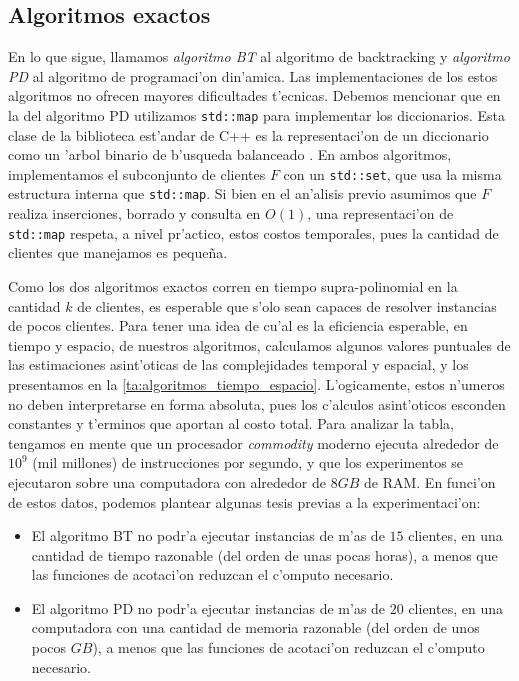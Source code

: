 \subsection{Algoritmos exactos}

\label{su:experimentacion_algoritmos_exactos}

En lo que sigue, llamamos \textit{algoritmo BT} al algoritmo de backtracking y \textit{algoritmo PD} al algoritmo de programaci'on din'amica. Las implementaciones de los estos algoritmos no ofrecen mayores dificultades t'ecnicas. Debemos mencionar que en la del algoritmo PD utilizamos \texttt{std::map} para implementar los diccionarios. Esta clase de la biblioteca est'andar de C++ es la representaci'on de un diccionario como un 'arbol binario de b'usqueda balanceado \cite{Pl00}. En ambos algoritmos, implementamos el subconjunto de clientes $F$ con un \texttt{std::set}, que usa la misma estructura interna que \texttt{std::map}. Si bien en el an'alisis previo asumimos que $F$ realiza inserciones, borrado y consulta en $O(1)$, una representaci'on de \texttt{std::map} respeta, a nivel pr'actico, estos costos temporales, pues la cantidad de clientes que manejamos es peque\~na.

Como los dos algoritmos exactos corren en tiempo supra-polinomial en la cantidad $k$ de clientes, es esperable que s'olo sean capaces de resolver instancias de pocos clientes. Para tener una idea de cu'al es la eficiencia esperable, en tiempo y espacio, de nuestros algoritmos, calculamos algunos valores puntuales de las estimaciones asint'oticas de las complejidades temporal y espacial, y los presentamos en la \autoref{ta:algoritmos_tiempo_espacio}. L'ogicamente, estos n'umeros no deben interpretarse en forma absoluta, pues los c'alculos asint'oticos esconden constantes y t'erminos que aportan al costo total. Para analizar la tabla, tengamos en mente que un procesador \textit{commodity} moderno ejecuta alrededor de $10^9$ (mil millones) de instrucciones por segundo, y que los experimentos se ejecutaron sobre una computadora con alrededor de $8GB$ de RAM. En funci'on de estos datos, podemos plantear algunas tesis previas a la experimentaci'on:

\begin{itemize}
	\item El algoritmo BT no podr'a ejecutar instancias de m'as de $15$ clientes, en una cantidad de tiempo razonable (del orden de unas pocas horas), a menos que las funciones de acotaci'on reduzcan el c'omputo necesario.
	\item El algoritmo PD no podr'a ejecutar instancias de m'as de $20$ clientes, en una computadora con una cantidad de memoria razonable (del orden de unos pocos $GB$), a menos que las funciones de acotaci'on reduzcan el c'omputo necesario.
\end{itemize}

